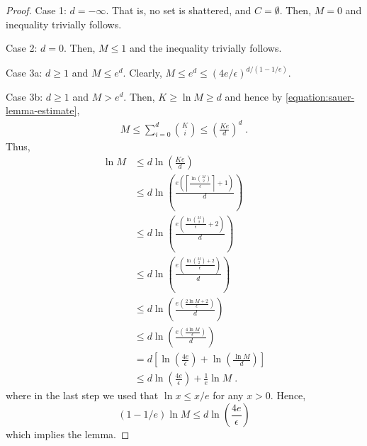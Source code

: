 \begin{proof}
Case 1: $d = -\infty$. That is, no set is shattered, and $C = \emptyset$.
Then, $M = 0$ and inequality trivially follows.

Case 2: $d = 0$. Then, $M \le 1$ and the inequality trivially follows.

Case 3a: $d \ge 1$ and $M \le e^d$. Clearly, $M \le e^d \le (4e/\epsilon)^{d/(1 - 1/e)}$.

Case 3b: $d \ge 1$ and $M > e^d$. Then, $K \ge \ln M \ge d$ and
hence by \eqref{equation:sauer-lemma-estimate},
\begin{align*}
M
\le \sum_{i=0}^d \binom{K}{i}
\le \left( \frac{Ke}{d} \right)^d \; .
\end{align*}
Thus,
\begin{align*}
\ln M
& \le d \ln \left( \frac{Ke}{d} \right) \\
& \le d \ln \left( \frac{e \left(\left\lceil \frac{\ln \binom{M}{2}}{\epsilon} \right\rceil + 1 \right)}{d} \right) \\
& \le d \ln \left( \frac{e \left(\frac{\ln \binom{M}{2}}{\epsilon} + 2 \right)}{d} \right) \\
& \le d \ln \left( \frac{e \left(\frac{\ln \binom{M}{2} + 2}{\epsilon} \right)}{d} \right) \\
& \le d \ln \left( \frac{e \left(\frac{2\ln M + 2}{\epsilon} \right)}{d} \right) \\
& \le d \ln \left( \frac{e \left(\frac{4\ln M}{\epsilon} \right)}{d} \right) \\
& = d \left[ \ln \left( \frac{4e}{\epsilon} \right)  + \ln \left(\frac{\ln M}{d} \right) \right] \\
& \le d \ln \left( \frac{4e}{\epsilon} \right) + \frac{1}{e} \ln M \; .
\end{align*}
where in the last step we used that $\ln x \le x/e$ for any $x > 0$.
Hence,
$$
(1 - 1/e) \ln M \le d \ln \left( \frac{4e}{\epsilon} \right)
$$
which implies the lemma.
\end{proof}
